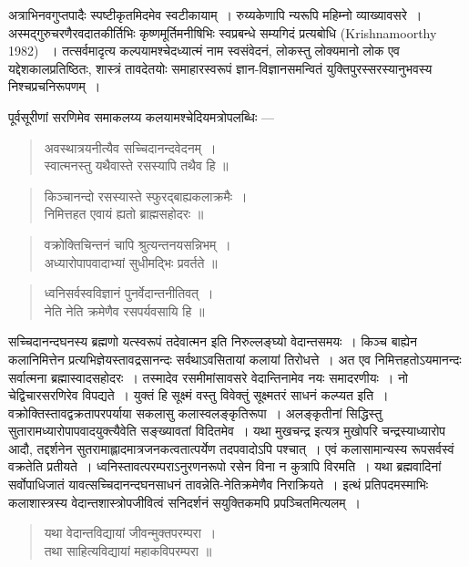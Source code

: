 {\dev अत्राभिनवगुप्तपादैः स्पष्टीकृतमिदमेव स्वटीकायाम्~। रुय्यकेणापि न्यरूपि महिम्नो व्याख्यावसरे~। अस्मद्गुरुचरणैरवदातकीर्तिभिः कृष्णमूर्तिमनीषिभिः स्वप्रबन्धे सम्यगिदं प्रत्यबोधि} (Krishnamoorthy 1982)  {\dev~। तत्सर्वमादृत्य कल्पयामश्चेदध्यात्मं नाम स्वसंवेदनं, लोकस्तु लोक्यमानो लोक एव यद्देशकालप्रतिष्ठितः, शास्त्रं तावदेतयोः समाहारस्वरूपं ज्ञान-विज्ञानसमन्वितं युक्तिपुरस्सरस्यानुभवस्य निश्चप्रचनिरूपणम्~।}   

{\dev पूर्वसूरीणां सरणिमेव समाकलय्य कलयामश्चेदियमत्रोपलब्धिः ---}
\begin{quote}
{\dev अवस्थात्रयनीत्यैव सच्चिदानन्दवेदनम्~।}\\
{\dev स्वात्मनस्तु यथैवास्ते रसस्यापि तथैव हि ॥}
\end{quote}
\begin{quote}
{\dev किञ्चानन्दो रसस्यास्ते स्फुरद्बाह्यकलाक्रमैः~।}\\
{\dev निमित्तहत एवायं ह्यतो ब्राह्मसहोदरः ॥}
\end{quote}
\begin{quote}
{\dev वक्रोक्तिचिन्तनं चापि श्रुत्यन्तनयसन्निभम्~।}\\
{\dev अध्यारोपापवादाभ्यां सुधीमद्भिः प्रवर्तते ॥}
\end{quote}
\begin{quote}
{\dev ध्वनिसर्वस्वविज्ञानं पुनर्वेदान्तनीतिवत्~।}\\
{\dev नेति नेति क्रमेणैव रसपर्यवसायि हि ॥}
\end{quote}

{\dev सच्चिदानन्दघनस्य ब्रह्मणो यत्स्वरूपं तदेवात्मन इति निरुल्लङ्घ्यो वेदान्तसमयः~। किञ्च बाह्येन कलानिमित्तेन प्रत्यभिज्ञेयस्तावद्रसानन्दः सर्वथाऽवसितायां कलायां तिरोधत्ते~। अत एव निमित्तहतोऽयमानन्दः सर्वात्मना ब्रह्मास्वादसहोदरः~। तस्मादेव रसमीमांसावसरे वेदान्तिनामेव नयः समादरणीयः~। नो चेद्विचारसरणिरेव विपद्यते~। युक्तं हि सूक्ष्मं वस्तु विवेक्तुं सूक्ष्मतरं साधनं कल्प्यत इति~। वक्रोक्तिस्तावद्वक्रतापरपर्याया सकलासु कलास्वलङ्कृतिरूपा~। अलङ्कृतीनां सिद्धिस्तु सुतारामध्यारोपापवादयुक्त्यैवेति सङ्ख्यावतां विदितमेव~। यथा मुखचन्द्र इत्यत्र मुखोपरि चन्द्रस्याध्यारोप आदौ, तद्दर्शनेन सुतरामाह्लादमात्रजनकत्वतात्पर्येण तदपवादोऽपि पश्चात्~।  एवं कलासामान्यस्य रूपसर्वस्वं वक्रतेति प्रतीयते~। ध्वनिस्तावत्परम्पराऽनुरणनरूपो रसेन विना न कुत्रापि विरमति~। यथा ब्रह्मवादिनां सर्वोपाधिजातं यावत्सच्चिदानन्दघनसाधनं तावन्नेति-नेतिक्रमेणैव निराक्रियते~। इत्थं प्रतिपदमस्माभिः कलाशास्त्रस्य वेदान्तशास्त्रोपजीवित्वं सनिदर्शनं सयुक्तिकमपि प्रपञ्चितमित्यलम्~।}
\begin{quote}
{\dev यथा वेदान्तविद्यायां जीवन्मुक्तपरम्परा~।}\\
{\dev तथा साहित्यविद्यायां महाकविपरम्परा ॥}
\end{quote}

